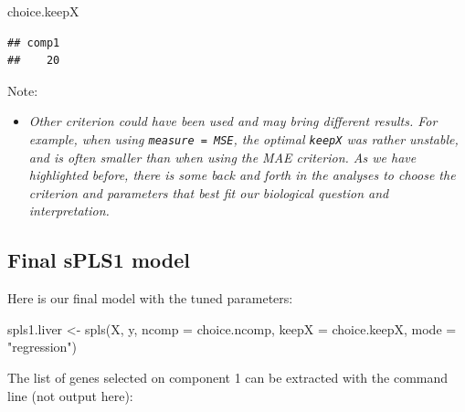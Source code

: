 \documentclass[
]{book}
\newenvironment{Shaded}{\begin{snugshade}}{\end{snugshade}}
\newcommand{\AttributeTok}[1]{\textcolor[rgb]{0.77,0.63,0.00}{#1}}
\newcommand{\DecValTok}[1]{\textcolor[rgb]{0.00,0.00,0.81}{#1}}
\newcommand{\FunctionTok}[1]{\textcolor[rgb]{0.00,0.00,0.00}{#1}}
\newcommand{\NormalTok}[1]{#1}
\newcommand{\OtherTok}[1]{\textcolor[rgb]{0.56,0.35,0.01}{#1}}
\newcommand{\SpecialCharTok}[1]{\textcolor[rgb]{0.00,0.00,0.00}{#1}}
\newcommand{\StringTok}[1]{\textcolor[rgb]{0.31,0.60,0.02}{#1}}
\providecommand{\tightlist}{%
  \setlength{\itemsep}{0pt}\setlength{\parskip}{0pt}}
\begin{document}
\begin{Shaded}
\begin{Highlighting}[]
\NormalTok{choice.keepX}
\end{Highlighting}
\end{Shaded}

\begin{verbatim}
## comp1 
##    20
\end{verbatim}

Note:

\begin{itemize}
\tightlist
\item
  \emph{Other criterion could have been used and may bring different results. For example, when using \texttt{measure\ =\ \textquotesingle{}MSE}, the optimal \texttt{keepX} was rather unstable, and is often smaller than when using the MAE criterion. As we have highlighted before, there is some back and forth in the analyses to choose the criterion and parameters that best fit our biological question and interpretation.}
\end{itemize}

\hypertarget{04:spls1-final}{%
\subsection{Final sPLS1 model}\label{04:spls1-final}}

Here is our final model with the tuned parameters:

\begin{Shaded}
\begin{Highlighting}[]
\NormalTok{spls1.liver }\OtherTok{\textless{}{-}} \FunctionTok{spls}\NormalTok{(X, y, }\AttributeTok{ncomp =}\NormalTok{ choice.ncomp, }\AttributeTok{keepX =}\NormalTok{ choice.keepX, }
                    \AttributeTok{mode =} \StringTok{"regression"}\NormalTok{)}
\end{Highlighting}
\end{Shaded}

The list of genes selected on component 1 can be extracted with the command line (not output here):

\begin{Shaded}
\end{Shaded}
\end{document}
